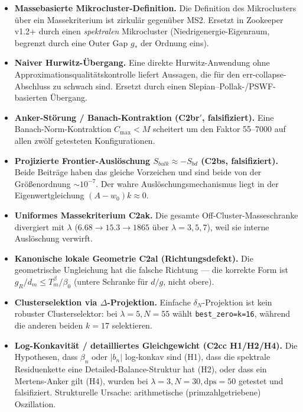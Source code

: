 \documentclass[12pt,a4paper]{article}
\theoremstyle{definition}
\theoremstyle{remark}
\begin{document}
\begin{itemize}
  \item \textbf{Massebasierte Mikrocluster-Definition.} Die Definition
    des Mikroclusters über ein Massekriterium ist zirkulär gegenüber MS2.
    Ersetzt in Zookeeper v1.2+ durch einen \emph{spektralen} Mikrocluster
    (Niedrigenergie-Eigenraum, begrenzt durch eine Outer Gap $g_*$ der
    Ordnung eins).

  \item \textbf{Naiver Hurwitz-Übergang.} Eine direkte Hurwitz-Anwendung
    ohne Approximationsqualitätskontrolle liefert Aussagen, die für den
    err-collapse-Abschluss zu schwach sind. Ersetzt durch einen
    Slepian--Pollak-/PSWF-basierten Übergang.

  \item \textbf{Anker-Störung / Banach-Kontraktion (C2br$'$,
    falsifiziert).} Eine Banach-Norm-Kontraktion $C_{\max}<M$ scheitert
    um den Faktor 55--7000 auf allen zwölf getesteten Konfigurationen.

  \item \textbf{Projizierte Frontier-Auslöschung $S_{bulk}\approx
    -S_{bd}$ (C2bs, falsifiziert).} Beide Beiträge haben das gleiche
    Vorzeichen und sind beide von der Größenordnung $\sim 10^{-7}$. Der
    wahre Auslöschungsmechanismus liegt in der Eigenwertgleichung
    $(A-w_0)k\approx 0$.

  \item \textbf{Uniformes Massekriterium C2ak.} Die gesamte
    Off-Cluster-Masseschranke divergiert mit $\lambda$
    ($6.68\to 15.3\to 1865$ über $\lambda=3,5,7$), weil sie interne
    Auslöschung verwirft.

  \item \textbf{Kanonische lokale Geometrie C2al (Richtungsdefekt).}
    Die geometrische Ungleichung hat die falsche Richtung --- die
    korrekte Form ist $g_R/d_m\le T_m^\beta/\beta_0$ (untere Schranke
    für $d/g$, nicht obere).

  \item \textbf{Clusterselektion via $\Delta$-Projektion.} Einfache
    $\delta_N$-Projektion ist kein robuster Clusterselektor: bei
    $\lambda=5,N=55$ wählt \texttt{best\_zero=k=16}, während die
    anderen beiden $k=17$ selektieren.

  \item \textbf{Log-Konkavität / detailliertes Gleichgewicht (C2cc
    H1/H2/H4).} Die Hypothesen, dass $\beta_n$ oder $|b_n|$
    log-konkav sind (H1), dass die spektrale Residuenkette eine
    Detailed-Balance-Struktur hat (H2), oder dass ein Mertens-Anker
    gilt (H4), wurden bei
    $\lambda=3,N=30,\mathrm{dps}=50$ getestet und falsifiziert.
    Strukturelle Ursache: arithmetische (primzahlgetriebene)
    Oszillation.


\end{itemize}
\end{document}
